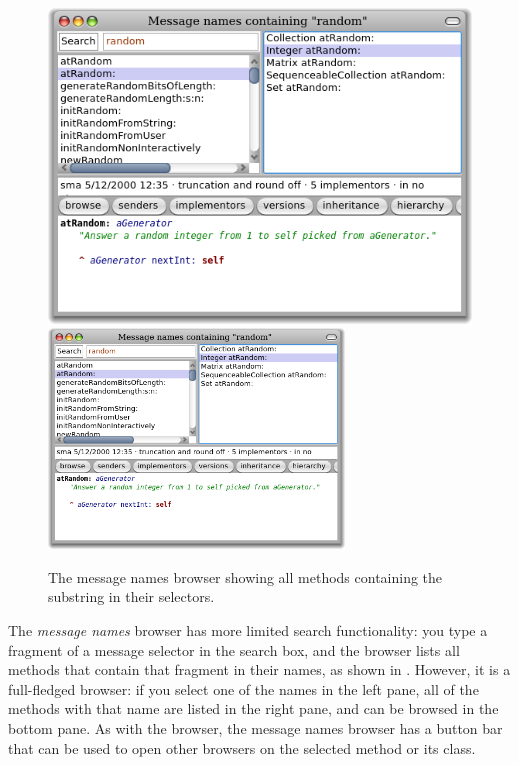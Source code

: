 \documentclass[a4paper,10pt,twoside]{book}
\begin{document}
\begin{figure}[btp]
	\begin{center}
	\ifluluelse
		{\includegraphics[width=\textwidth]{methodNamesRandom}}
		{\includegraphics[width=0.7\textwidth]{methodNamesRandom}}
	\end{center}
	\caption{The message names browser showing all methods containing the substring  in their selectors.}
\end{figure}

The \emph{message names} browser has more limited search functionality: you type a fragment of a message selector in the search box, and the browser lists all methods that contain that fragment in their names, as shown in .
However, it is a full-fledged browser:
if you select one of the names in the left pane, all of the methods with that name are listed in the right pane, and can be browsed in the bottom pane.
As with the browser, the message names browser has a button bar that can be used to open other  browsers on the selected method or its class.
\end{document}
